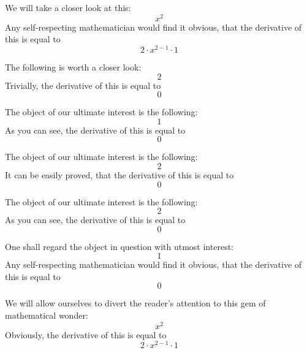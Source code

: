 \documentclass{article}
\begin{document}
We will take a closer look at this:
\begin{equation}
x ^{2 } 
\end{equation}
Any self-respecting mathematician would find it obvious, that the derivative of this is equal to
\begin{equation}
2 \cdot x ^{2 - 1 } \cdot 1 
\end{equation}

The following is worth a closer look:
\begin{equation}
2 
\end{equation}
Trivially, the derivative of this is equal to
\begin{equation}
0 
\end{equation}

The object of our ultimate interest is the following:
\begin{equation}
1 
\end{equation}
As you can see, the derivative of this is equal to
\begin{equation}
0 
\end{equation}

The object of our ultimate interest is the following:
\begin{equation}
2 
\end{equation}
It can be easily proved, that the derivative of this is equal to
\begin{equation}
0 
\end{equation}

The object of our ultimate interest is the following:
\begin{equation}
2 
\end{equation}
As you can see, the derivative of this is equal to
\begin{equation}
0 
\end{equation}

One shall regard the object in question with utmost interest:
\begin{equation}
1 
\end{equation}
Any self-respecting mathematician would find it obvious, that the derivative of this is equal to
\begin{equation}
0 
\end{equation}

We will allow ourselves to divert the reader's attention to this gem of mathematical wonder:
\begin{equation}
x ^{2 } 
\end{equation}
Obviously, the derivative of this is equal to
\begin{equation}
2 \cdot x ^{2 - 1 } \cdot 1 
\end{equation}
\end{document}
